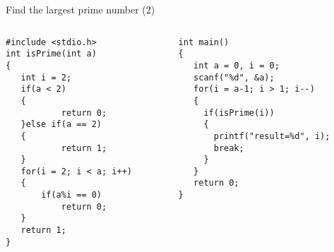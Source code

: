 \ifx\answer\undefined
\begin{frame}[fragile]{Find the largest prime number (2)}
\begin{columns}
\begin{column}{0.44\linewidth}
\begin{lstlisting}[xleftmargin=0.03\linewidth]
#include <stdio.h>
int isPrime(int a)
{
   int i = 2;
   if(a < 2)
   {
           return 0;
   }else if(a == 2)
   {
           return 1;
   }
   for(i = 2; i < a; i++)
   {
       if(a%i == 0)
           return 0;
   }
   return 1;
}
\end{lstlisting}
\end{column}
\begin{column}{0.53\linewidth}
\begin{lstlisting}[firstnumber=15, linewidth=0.96\linewidth, xleftmargin=0.04\linewidth]
int main()
{
   int a = 0, i = 0;
   scanf("%d", &a);
   for(i = a-1; i > 1; i--)
   {
     if(isPrime(i))
     {
       printf("result=%d", i);
       break;
     }
   }
   return 0;
}
\end{lstlisting}
\end{column}
\end{columns}

\end{frame}
\fi

%
%
%
%
%


